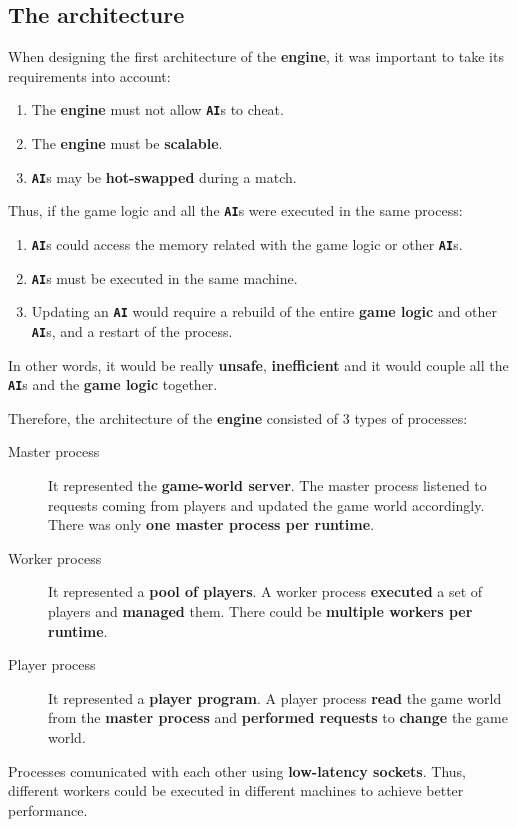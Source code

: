 \documentclass[a4paper,11pt,titlepage,abstract,numbers=noenddot,automark,mnsy,intlimits,rgb,dvipsnames]{report}
\begin{document}
\subsection{The architecture}
When designing the first architecture of the \textbf{engine}, it was important to take its requirements into account:
\begin{enumerate}
\item
The \textbf{engine} must not allow \textbf{\texttt{AI}}s to cheat.
\item
The \textbf{engine} must be \textbf{scalable}.
\item
\textbf{\texttt{AI}}s may be \textbf{hot-swapped} during a match.
\end{enumerate}
Thus, if the game logic and all the \textbf{\texttt{AI}}s were executed in the same process:
\begin{enumerate}
\item
\textbf{\texttt{AI}}s could access the memory related with the game logic or other \textbf{\texttt{AI}}s.
\item
\textbf{\texttt{AI}}s must be executed in the same machine.
\item
Updating an \textbf{\texttt{AI}} would require a rebuild of the entire \textbf{game logic} and other \textbf{\texttt{AI}}s, and a restart of the process.
\end{enumerate}
In other words, it would be really \textbf{unsafe}, \textbf{inefficient} and it would couple all the \textbf{\texttt{AI}}s and the \textbf{game logic} together.

Therefore, the architecture of the \textbf{engine} consisted of 3 types of processes:
\begin{description}
\item[Master process]
It represented the \textbf{game-world server}. The master process listened to requests coming from
  players and updated the game world accordingly. There was only \textbf{one master process per runtime}.
\item[Worker process]
It represented a \textbf{pool of players}. A worker process \textbf{executed} a set of players and
  \textbf{managed} them. There could be \textbf{multiple workers per runtime}.
\item[Player process]
It represented a \textbf{player program}. A player process \textbf{read} the game world from the
  \textbf{master process} and \textbf{performed requests} to \textbf{change} the game world.
\end{description}
Processes comunicated with each other using \textbf{low-latency sockets}. Thus, different workers could be executed
in different machines to achieve better performance.
\end{document}
